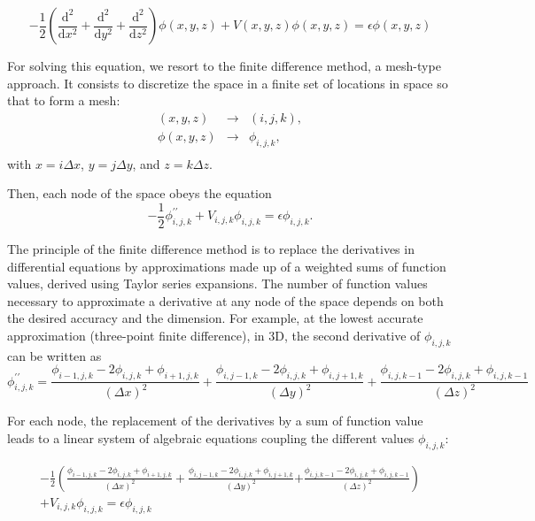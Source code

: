 \documentclass[11pt,a4paper]{article}
\begin{document}
\begin{equation}
  \label{eq:1}
  -\frac{1}{2}\left(\frac{\mathrm{d}^2}{\mathrm{d}x^2}+\frac{\mathrm{d}^2}{\mathrm{d}y^2}+\frac{\mathrm{d}^2}{\mathrm{d}z^2}\right)\phi(x,y,z)+V(x,y,z)\phi(x,y,z)=\epsilon\phi(x,y,z)
\end{equation}

For solving this equation, we resort to the finite difference method, a mesh-type approach\cite{varga2011,mazumder2015}.
It consists to discretize the space in a finite set of locations in space so that to form a mesh:
\begin{eqnarray}
  (x,y,z)&\rightarrow& (i,j,k), \\
  \phi(x,y,z)&\rightarrow& \phi_{i,j,k}, \\
\end{eqnarray}
with $x=i\Delta x$, $y=j\Delta y$, and $z=k\Delta z$.

Then, each node of the space obeys the equation
\begin{equation}
  \label{eq:eq1}
  -\frac{1}{2}\phi^{\prime\prime}_{i,j,k}+V_{i,j,k}\phi_{i,j,k}=\epsilon\phi_{i,j,k}.
\end{equation}

The principle of the finite difference method is to replace the derivatives in differential equations by approximations made up of a weighted sums of function values, derived using Taylor series expansions.
The number of function values necessary to approximate a derivative at any node  of the space depends on both the desired accuracy and the dimension.
For example, at the lowest accurate approximation (three-point finite difference), in  3D, the second derivative of $\phi_{i,j,k}$ can be written as
\begin{equation}
  \phi^{\prime\prime}_{i,j,k}=\frac{\phi_{i-1,j,k}-2\phi_{i,j,k}+\phi_{i+1,j,k}}{(\Delta x)^2}
+  \frac{\phi_{i,j-1,k}-2\phi_{i,j,k}+\phi_{i,j+1,k}}{(\Delta y)^2}
+  \frac{\phi_{i,j,k-1}-2\phi_{i,j,k}+\phi_{i,j,k-1}}{(\Delta z)^2}
\end{equation}

For each node, the replacement of the derivatives by a sum of function value leads to a linear system of algebraic equations coupling the different values $\phi_{i,j,k}$:

\begin{eqnarray}
  \label{eq:2}
-\frac{1}{2}\left(  \frac{\phi_{i-1,j,k}-2\phi_{i,j,k}+\phi_{i+1,j,k}}{(\Delta x)^2}\right.
 +  \frac{\phi_{i,j-1,k}-2\phi_{i,j,k}+\phi_{i,j+1,k}}{(\Delta y)^2}
 \left. +  \frac{\phi_{i,j,k-1}-2\phi_{i,j,k}+\phi_{i,j,k-1}}{(\Delta z)^2}\right)\nonumber\\
+V_{i,j,k} \phi_{i,j,k}=\epsilon\phi_{i,j,k}
\end{eqnarray}
\end{document}
